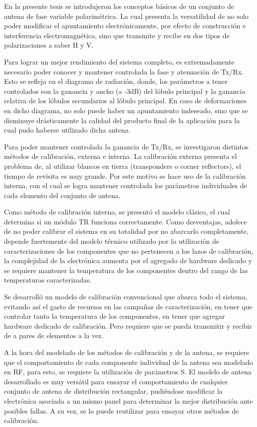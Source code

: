 En la presente tesis se introdujeron los conceptos básicos de un conjunto de antena de fase variable polarimétrica. La cual 
presenta la versatilidad de no solo poder modificar el apuntamiento electrónicamente, por efecto de construcción e interferencia 
electromagnética, sino que transmite y recibe en dos tipos de polarizaciones a saber H y V.

Para lograr un mejor rendimiento del sistema completo, es extremadamente necesario poder conocer y mantener controlada la fase 
y atenuación de Tx/Rx. Esto se refleja en el diagrama de radiación, donde, los parámetros a tener controlados son la ganancia
y ancho (a -3dB) del lóbulo principal y la ganancia relativa de los lóbulos secundarios al lóbulo principal. En caso de 
deformaciones en dicho diagrama, no solo puede haber un apuntamiento indeseado, sino que se disminuye drásticamente la calidad 
del producto final de la aplicación para la cual pudo haberse utilizado dicha antena.

Para poder mantener controlada la ganancia de Tx/Rx, se investigaron distintos métodos de calibración, externa e interna. La 
calibración externa presenta el problema de, al utilizar blancos en tierra (transponders o corner reflectors), el tiempo de 
revisita es muy grande. Por este motivo se hace uso de la calibración interna, con el cual se logra mantener controlada 
los parámetros individuales de cada elemento del conjunto de antena. 

Como método de calibración interna, se presentó el modelo clásico, el cual determina si un módulo TR funciona correctamente. 
Como desventajas, adolece de no poder calibrar el sistema en su totalidad por no abarcarlo completamente, depende fuertemente del
modelo térmico utilizado por la utilización de caracterizaciones de los componentes que no pertenecen a los lazos de calibración, 
la complejidad de la electrónica aumenta por el agregado de hardware dedicado y se requiere mantener la temperatura de los 
componentes dentro del rango de las temperaturas caracterizadas.

Se desarrolló un modelo de calibración convencional que abarca todo el sistema, evitando así el gasto de recursos en las 
campañas de caracterización, en tener que controlar tanto la temperatura de los componentes, en tener que agregar hardware 
dedicado de calibración. Pero requiere que se pueda transmitir y recibir de a pares de elementos a la vez. 

A la hora del modelado de los métodos de calibración y de la antena, se requiere que el comportamiento de cada componente 
individual de la antena sea modelado en RF, para esto, se requiere la utilización de parámetros S. El modelo de antena 
desarrollado es muy versátil para ensayar el comportamiento de cualquier conjunto de antena de distribución rectangular, 
pudiéndose modificar la electrónica asociada a un mismo panel para determinar la mejor distribución ante posibles fallas.
A su vez, se lo puede reutilizar para ensayar otros métodos de calibración.

